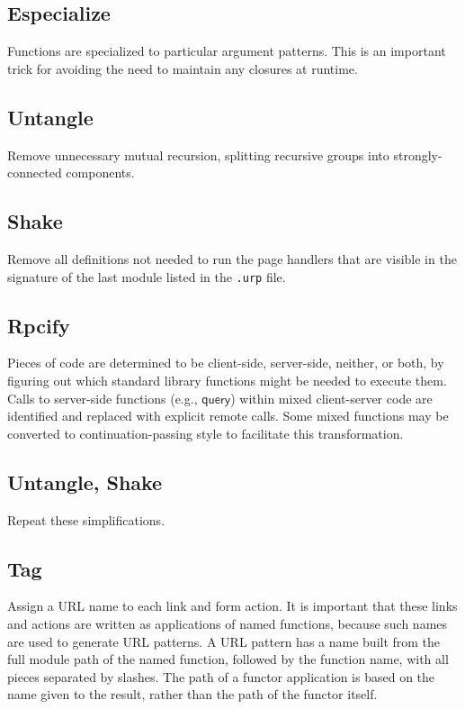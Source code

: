 \documentclass{article}
\newcommand{\mt}[1]{\mathsf{#1}}
\begin{document}
\subsection{Especialize}

Functions are specialized to particular argument patterns.  This is an important trick for avoiding the need to maintain any closures at runtime.

\subsection{Untangle}

Remove unnecessary mutual recursion, splitting recursive groups into strongly-connected components.

\subsection{Shake}

Remove all definitions not needed to run the page handlers that are visible in the signature of the last module listed in the \texttt{.urp} file.

\subsection{Rpcify}

Pieces of code are determined to be client-side, server-side, neither, or both, by figuring out which standard library functions might be needed to execute them.  Calls to server-side functions (e.g., $\mt{query}$) within mixed client-server code are identified and replaced with explicit remote calls.  Some mixed functions may be converted to continuation-passing style to facilitate this transformation.

\subsection{Untangle, Shake}

Repeat these simplifications.

\subsection{\label{tag}Tag}

Assign a URL name to each link and form action.  It is important that these links and actions are written as applications of named functions, because such names are used to generate URL patterns.  A URL pattern has a name built from the full module path of the named function, followed by the function name, with all pieces separated by slashes.  The path of a functor application is based on the name given to the result, rather than the path of the functor itself.
\end{document}
